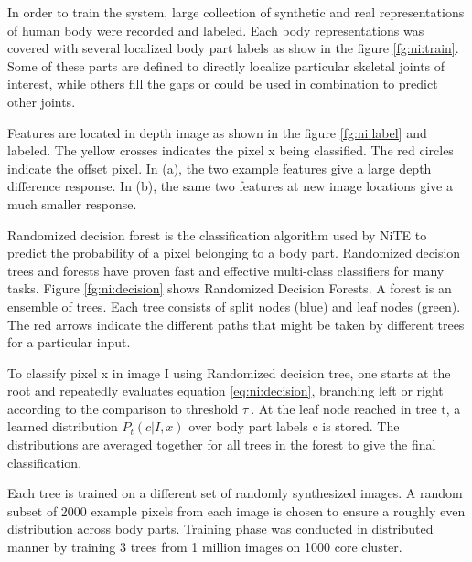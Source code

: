 

In order to train the system, large collection of synthetic and real representations of human body were recorded and labeled. Each body representations was covered with several localized body part labels as show in the figure \ref{fg:ni:train}. Some of these parts are defined to directly localize particular skeletal joints of interest, while others fill the gaps or could be used in combination to predict other joints.



Features are located in depth image as shown in the figure \ref{fg:ni:label} and labeled. The yellow crosses indicates the pixel x being classified. The red circles indicate the offset pixel. In (a), the two example features give a large depth difference response. In (b), the same two features at new image locations give a much smaller response.



Randomized decision forest is the classification algorithm used by NiTE to predict the probability of a pixel belonging to a body part. Randomized decision trees and forests have proven fast and effective multi-class classifiers for many tasks. Figure \ref{fg:ni:decision} shows Randomized Decision Forests. A forest is an ensemble of trees. Each tree consists of split nodes (blue) and leaf nodes (green). The red arrows indicate the different paths that might be taken by different trees for a particular input.



To classify pixel x in image I using Randomized decision tree, one starts at the root and repeatedly evaluates equation \ref{eq:ni:decision}, branching left or right according to the comparison to threshold {$ \tau\ $}. At the leaf node reached in tree t, a learned distribution $ P_{t}(c|I,x) $ over body part labels c is stored. The distributions are averaged together for all trees in the forest to give the final classification.



Each tree is trained on a different set of randomly synthesized images. A random subset of 2000 example pixels from each image is chosen to ensure a roughly even distribution across body parts. Training phase was conducted in distributed manner by training 3 trees from 1 million images on 1000 core cluster.

